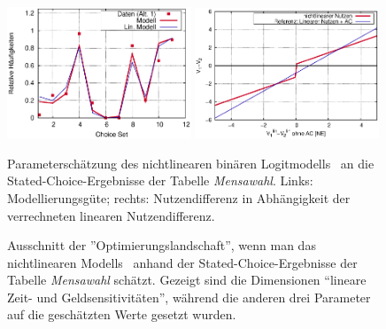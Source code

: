\begin{figure}
 \includegraphics[width=0.49\textwidth]
   {figsDiscr/nonlinUtility_statedChoiceWS1213_fProb.eps}
 \includegraphics[width=0.49\textwidth]
   {figsDiscr/nonlinUtility_statedChoiceWS1213_Vfun.eps}
  \caption{\label{fig:mensaNl}Parametersch\"atzung des
    nichtlinearen bin\"aren Logitmodells~ an die
    Stated-Choice-Ergebnisse der Tabelle \emph{Mensawahl}. Links:
    Modellierungsg\"ute; rechts: Nutzendifferenz in Abh\"angigkeit der
    verrechneten linearen Nutzendifferenz.
}
\end{figure}

\begin{figure}
  \caption{\label{fig:mensaLandscape}Ausschnitt der
    ''Optimierungslandschaft'', wenn man das
    nichtlinearen Modells~ anhand der
    Stated-Choice-Ergebnisse der Tabelle \emph{Mensawahl}
    sch\"atzt. Gezeigt sind die Dimensionen  
    ``lineare Zeit- und Geldsensitivit\"aten'', w\"ahrend die anderen
    drei Parameter auf die gesch\"atzten Werte gesetzt wurden.
}
\end{figure}

